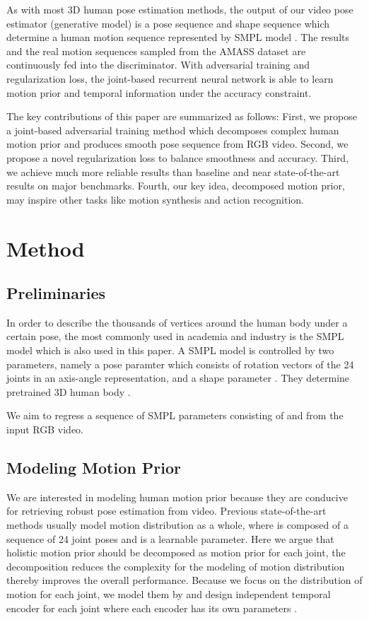 \documentclass{svproc}
\begin{document}
As with most 3D human pose estimation methods, the output of our video pose estimator (generative model) is a pose sequence  and shape sequence  which determine a human motion sequence represented by SMPL model \cite{loper2015smpl}. The results and the real motion sequences sampled from the AMASS dataset \cite{mahmood2019amass} are continuously fed into the discriminator. With adversarial training and regularization loss, the joint-based recurrent neural network is able to learn motion prior and temporal information under the accuracy constraint.

The key contributions of this paper are summarized as follows: First, we propose a joint-based adversarial training method which decomposes complex human motion prior and produces smooth pose sequence from RGB video. Second, we propose a novel regularization loss to balance smoothness and accuracy. Third, we achieve much more reliable results than baseline and near state-of-the-art results on major benchmarks. Fourth, our key idea, decomposed motion prior, may inspire other tasks like motion synthesis and action recognition.


\section{Method}
\subsection{Preliminaries}
In order to describe the thousands of vertices around the human body under a certain pose, the most commonly used in academia and industry is the SMPL model which is also used in this paper. A SMPL model is controlled by two parameters, namely a pose paramter  which consists of rotation vectors of the 24 joints in an axis-angle representation, and a shape parameter . They determine pretrained 3D human body . 

We aim to regress a sequence of SMPL parameters consisting of  and  from the input RGB video. 

\subsection{Modeling Motion Prior}
We are interested in modeling human motion prior because they are conducive for retrieving robust pose estimation from video. Previous state-of-the-art methods usually model motion distribution  as a whole, where  is composed of a sequence of 24 joint poses  and  is a learnable parameter. Here we argue that holistic motion prior should be decomposed as motion prior for each joint, the decomposition reduces the complexity for the modeling of motion distribution thereby improves the overall performance. Because we focus on the distribution of motion for each joint, we model them by  and design independent temporal encoder for each joint where each encoder has its own parameters .
\end{document}
